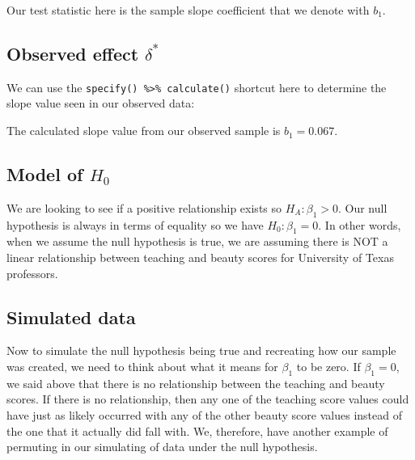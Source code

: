 \documentclass[12pt, krantz2,]{krantz}
\makeatletter
\newenvironment{Shaded}{\begin{snugshade}}{\end{snugshade}}
\newcommand{\DataTypeTok}[1]{\textcolor[rgb]{0.27,0.27,0.27}{#1}}
\newcommand{\KeywordTok}[1]{\textcolor[rgb]{0.27,0.27,0.27}{\textbf{#1}}}
\newcommand{\NormalTok}[1]{#1}
\newcommand{\OperatorTok}[1]{\textcolor[rgb]{0.43,0.43,0.43}{\textbf{#1}}}
\newcommand{\StringTok}[1]{\textcolor[rgb]{0.5,0.5,0.5}{#1}}
\newenvironment{kframe}{%
\medskip{}
\setlength{\fboxsep}{.8em}
 \def\at@end@of@kframe{}%
 \ifinner\ifhmode%
  \def\at@end@of@kframe{\end{minipage}}%
  \begin{minipage}{\columnwidth}%
 \fi\fi%
 \def\FrameCommand##1{\hskip\@totalleftmargin \hskip-\fboxsep
 \colorbox{shadecolor}{##1}\hskip-\fboxsep
     \hskip-\linewidth \hskip-\@totalleftmargin \hskip\columnwidth}%
 \MakeFramed {\advance\hsize-\width
   \@totalleftmargin\z@ \linewidth\hsize
   \@setminipage}}%
 {\par\unskip\endMakeFramed%
 \at@end@of@kframe}
\renewenvironment{Shaded}{\begin{kframe}}{\end{kframe}}
\makeatother
\begin{document}
Our test statistic here is the sample slope coefficient that we denote with \(b_1\).

\hypertarget{observed-effect-delta-1}{%
\subsection{\texorpdfstring{Observed effect \(\delta^*\)}{Observed effect \textbackslash{}delta\^{}*}}\label{observed-effect-delta-1}}

We can use the \texttt{specify()\ \%\textgreater{}\%\ calculate()} shortcut here to determine the slope value seen in our observed data:

\begin{Shaded}
\end{Shaded}

The calculated slope value from our observed sample is \(b_1 = 0.067\).

\hypertarget{model-of-h_0-1}{%
\subsection{\texorpdfstring{Model of \(H_0\)}{Model of H\_0}}\label{model-of-h_0-1}}

We are looking to see if a positive relationship exists so \(H_A: \beta_1 > 0\). Our null hypothesis is always in terms of equality so we have \(H_0: \beta_1 = 0\). In other words, when we assume the null hypothesis is true, we are assuming there is NOT a linear relationship between teaching and beauty scores for University of Texas professors.

\hypertarget{simulated-data-1}{%
\subsection{Simulated data}\label{simulated-data-1}}

Now to simulate the null hypothesis being true and recreating how our sample was created, we need to think about what it means for \(\beta_1\) to be zero. If \(\beta_1 = 0\), we said above that there is no relationship between the teaching and beauty scores. If there is no relationship, then any one of the teaching score values could have just as likely occurred with any of the other beauty score values instead of the one that it actually did fall with. We, therefore, have another example of permuting in our simulating of data under the null hypothesis.
\end{document}
